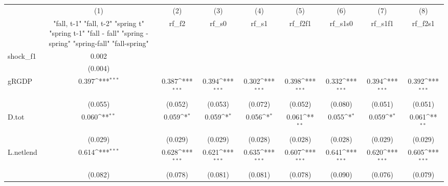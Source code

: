 {
\def\sym#1{\ifmmode^{#1}\else\(^{#1}\)\fi}
\begin{tabular}{l*{8}{c}}
\toprule
            &\multicolumn{1}{c}{(1)}&\multicolumn{1}{c}{(2)}&\multicolumn{1}{c}{(3)}&\multicolumn{1}{c}{(4)}&\multicolumn{1}{c}{(5)}&\multicolumn{1}{c}{(6)}&\multicolumn{1}{c}{(7)}&\multicolumn{1}{c}{(8)}\\
            &\multicolumn{1}{c}{  "fall, t-1" "fall, t-2" "spring t" "spring t-1"  "fall - fall" "spring - spring" "spring-fall" "fall-spring" }&\multicolumn{1}{c}{rf\_f2}&\multicolumn{1}{c}{rf\_s0}&\multicolumn{1}{c}{rf\_s1}&\multicolumn{1}{c}{rf\_f2f1}&\multicolumn{1}{c}{rf\_s1s0}&\multicolumn{1}{c}{rf\_s1f1}&\multicolumn{1}{c}{rf\_f2s1}\\
\midrule
shock\_f1    &       0.002         &                     &                     &                     &                     &                     &                     &                     \\
            &     (0.004)         &                     &                     &                     &                     &                     &                     &                     \\
\addlinespace
gRGDP       &       0.397\sym{***}&       0.387\sym{***}&       0.394\sym{***}&       0.302\sym{***}&       0.398\sym{***}&       0.332\sym{***}&       0.394\sym{***}&       0.392\sym{***}\\
            &     (0.055)         &     (0.052)         &     (0.053)         &     (0.072)         &     (0.052)         &     (0.080)         &     (0.051)         &     (0.051)         \\
\addlinespace
D.tot       &       0.060\sym{**} &       0.059\sym{*}  &       0.059\sym{*}  &       0.056\sym{*}  &       0.061\sym{**} &       0.055\sym{*}  &       0.059\sym{*}  &       0.061\sym{**} \\
            &     (0.029)         &     (0.029)         &     (0.029)         &     (0.028)         &     (0.028)         &     (0.028)         &     (0.029)         &     (0.029)         \\
\addlinespace
L.netlend   &       0.614\sym{***}&       0.628\sym{***}&       0.621\sym{***}&       0.635\sym{***}&       0.607\sym{***}&       0.641\sym{***}&       0.620\sym{***}&       0.605\sym{***}\\
            &     (0.082)         &     (0.078)         &     (0.081)         &     (0.081)         &     (0.078)         &     (0.090)         &     (0.076)         &     (0.079)         \\

\end{tabular}}
